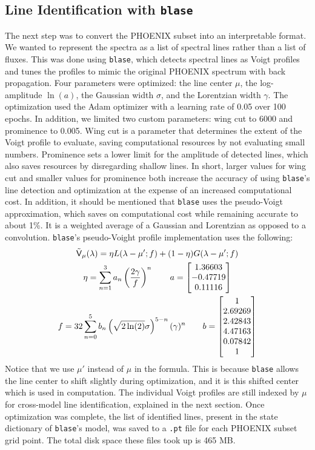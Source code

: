 \documentclass[twocolumn]{aastex631}
\begin{document}
\subsection{Line Identification with \texttt{blase}}
The next step was to convert the PHOENIX subset into an interpretable format.
We wanted to represent the spectra as a list of spectral lines rather than a
list of fluxes. This was done using \texttt{blase}, which detects spectral 
lines as Voigt profiles and tunes the profiles to mimic the original 
PHOENIX spectrum with back propagation. Four parameters were optimized: the 
line center $\mu$, the log-amplitude $\ln(a)$, the Gaussian width $\sigma$, and the 
Lorentzian width $\gamma$. The optimization used the Adam optimizer with a
learning rate of 0.05 over 100 epochs. In addition, we limited two custom 
parameters: wing cut to 6000 and prominence to 0.005. Wing cut is a parameter
that determines the extent of the Voigt profile to evaluate, saving
computational resources by not evaluating small numbers. Prominence sets a
lower limit for the amplitude of detected lines, which also saves resources 
by disregarding shallow lines. In short, larger values for wing cut and 
smaller values for prominence both increase the accuracy of using
\texttt{blase}'s line detection and optimization at the expense of an
increased computational cost. In addition, it should be mentioned that
\texttt{blase} uses the pseudo-Voigt approximation, which saves on 
computational cost while remaining accurate to about 1\%. It is a 
weighted average of a Gaussian and Lorentzian as opposed to a convolution.
\texttt{blase}'s pseudo-Voight profile implementation uses the following:
\begin{gather}
    \tilde{\mathsf{V}}_\mu(\lambda) = \eta L(\lambda - \mu'; f) + (1 - \eta)G(\lambda - \mu'; f)\\
    \nonumber \eta = \sum_{n=1}^3 a_n\left(\dfrac{2\gamma}{f}\right)^n \qquad a = \mqty[1.36603 \\ -0.47719 \\ 0.11116]\\
    \nonumber f = 32\sum_{n=0}^5 b_n \left(\sqrt{2\ln(2)}\sigma\right)^{5-n}(\gamma)^n \qquad b = \mqty[1 \\ 2.69269 \\ 2.42843 \\ 4.47163 \\ 0.07842 \\ 1]
\end{gather}
Notice that we use $\mu'$ instead of $\mu$ in the formula. This is because
\texttt{blase} allows the line center to shift slightly during optimization, 
and it is this shifted center which is used in computation. The individual 
Voigt profiles are still indexed by $\mu$ for cross-model line identification,
explained in the next section. Once optimization was complete, the list of 
identified lines, present in the state dictionary of \texttt{blase}'s model, 
was saved to a \texttt{.pt} file for each PHOENIX subset grid point. The total 
disk space these files took up is 465 MB.
\end{document}
